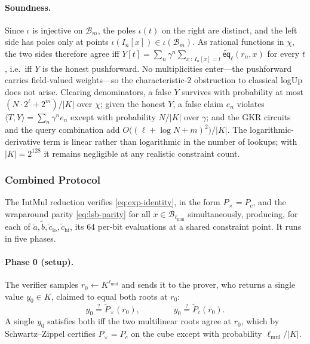 \documentclass{article}
\theoremstyle{definition}
\newcommand*{\mle}{\widetilde}
\newcommand{\eq}{\mathsf{eq}}
\newcommand{\BB}{\mathcal{B}}
\begin{document}
\paragraph{Soundness.}
Since $\iota$ is injective on $\BB_m$, the poles $\iota(t)$ on the right are distinct, and the left side has poles only at points $\iota(I_n[x]) \in \iota(\BB_m)$. As rational functions in $\chi$, the two sides therefore agree iff $Y[t] = \sum_n \gamma^n \sum_{x \,:\, I_n[x] = t} \mle{\eq}_\ell(r_n, x)$ for every $t$, i.e.\ iff $Y$ is the honest pushforward. No multiplicities enter---the pushforward carries field-valued weights---so the characteristic-$2$ obstruction to classical logUp does not arise. Clearing denominators, a false $Y$ survives with probability at most $(N \cdot 2^\ell + 2^m) / |K|$ over $\chi$; given the honest $Y$, a false claim $e_n$ violates $\langle T, Y \rangle = \sum_n \gamma^n e_n$ except with probability $N / |K|$ over $\gamma$; and the GKR circuits and the query combination add $O\bigl( (\ell + \log N + m)^2 \bigr) / |K|$. The logarithmic-derivative term is linear rather than logarithmic in the number of lookups; with $|K| = 2^{128}$ it remains negligible at any realistic constraint count.

\subsubsection{Combined Protocol}
\label{sec:intmul-combined}

The IntMul reduction verifies \eqref{eq:exp-identity}, in the form $P_\times = P_c$, and the wraparound parity \eqref{eq:lsb-parity} for all $x \in \BB_{\ell_\text{mul}}$ simultaneously, producing, for each of $\mle{a}, \mle{b}, \mle{c}_\text{lo}, \mle{c}_\text{hi}$, its $64$ per-bit evaluations at a shared constraint point. It runs in five phases.

\paragraph{Phase 0 (setup).}
The verifier samples $r_0 \gets K^{\ell_\text{mul}}$ and sends it to the prover, who returns a single value $y_0 \in K$, claimed to equal both roots at $r_0$:
\[
  y_0 \stackrel{?}{=} \mle{P}_\times(r_0), \qquad\qquad y_0 \stackrel{?}{=} \mle{P}_c(r_0).
\]
A single $y_0$ satisfies both iff the two multilinear roots agree at $r_0$, which by Schwartz--Zippel certifies $P_\times = P_c$ on the cube except with probability $\ell_\text{mul} / |K|$.
\end{document}
